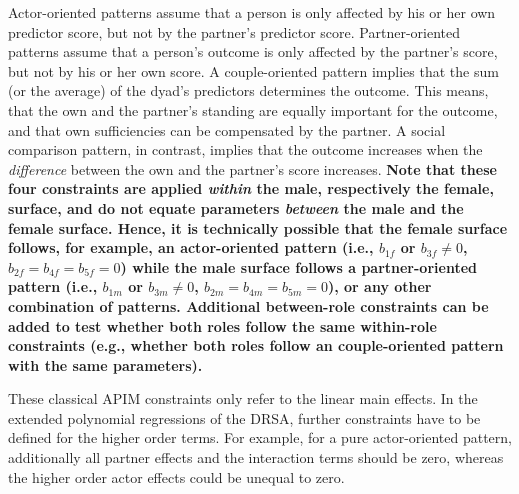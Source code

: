 \documentclass[jou,a4paper,draftfirst]{apa6}
\newcommand{\added}[1]{\textcolor{colour_added}{\bf{#1}}}
\begin{document}
Actor-oriented patterns assume that a person is only affected by his or her own predictor score, but not by the partner's predictor score. Partner-oriented patterns assume that a person's outcome is only affected by the partner's score, but not by his or her own score. A couple-oriented pattern implies that the sum (or the average) of the dyad's predictors determines the outcome. This means, that the own and the partner's standing are equally important for the outcome, and that own sufficiencies can be compensated by the partner. A social comparison pattern, in contrast, implies that the outcome increases when the \emph{difference} between the own and the partner's score increases. \added{Note that these four constraints are applied \emph{within} the male, respectively the female, surface, and do not equate parameters \emph{between} the male and the female surface. Hence, it is technically possible that the female surface follows, for example, an actor-oriented pattern (i.e., $b_{1f}$ or $b_{3f} \neq 0$, $b_{2f} = b_{4f} = b_{5f} = 0$) while the male surface follows a partner-oriented pattern (i.e., $b_{1m}$ or $b_{3m} \neq 0$, $b_{2m} = b_{4m} = b_{5m} = 0$), or any other combination of patterns. Additional between-role constraints can be added to test whether both roles follow the same within-role constraints (e.g., whether both roles follow an couple-oriented pattern with the same parameters).
}

These classical APIM constraints only refer to the linear main effects. In the extended polynomial regressions of the DRSA, further constraints have to be defined for the higher order terms. For example, for a pure actor-oriented pattern, additionally all partner effects and the interaction terms should be zero, whereas the higher order actor effects could be unequal to zero.
\end{document}
